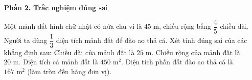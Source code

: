 \textbf{Phần 2. Trắc nghiệm đúng sai}

\begin{ex} %
Một mảnh đất hình chữ nhật có nửa chu vi là $45\text{ m}$, chiều rộng bằng $\dfrac{4}{5}$ chiều dài. Người ta dùng $\dfrac{1}{3}$ diện tích mảnh đất để đào ao thả cá. Xét tính đúng sai của các khẳng định sau:
\choiceTF
{\True Chiều dài của mảnh đất là $25\text{ m}$.}
{\True Chiều rộng của mảnh đất là $20\text{ m}$.}
{Diện tích cả mảnh đất là $450\text{ m}^2$.}
{\True Diện tích phần đất đào ao thả cá là $167\text{ m}^2$ (làm tròn đến hàng đơn vị).}
\end{ex}

